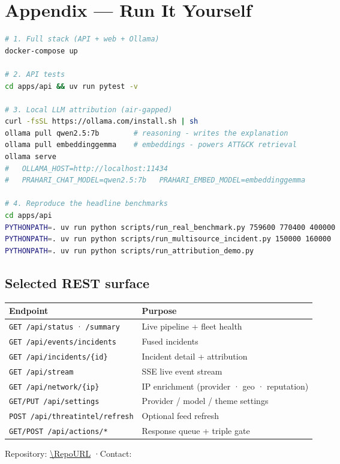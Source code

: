 \documentclass[11pt,a4paper]{article}
\begin{document}
\appendix
\section{Appendix — Run It Yourself}

\begin{lstlisting}[language=bash]
# 1. Full stack (API + web + Ollama)
docker-compose up

# 2. API tests
cd apps/api && uv run pytest -v

# 3. Local LLM attribution (air-gapped)
curl -fsSL https://ollama.com/install.sh | sh
ollama pull qwen2.5:7b        # reasoning - writes the explanation
ollama pull embeddinggemma    # embeddings - powers ATT&CK retrieval
ollama serve
#   OLLAMA_HOST=http://localhost:11434
#   PRAHARI_CHAT_MODEL=qwen2.5:7b   PRAHARI_EMBED_MODEL=embeddinggemma

# 4. Reproduce the headline benchmarks
cd apps/api
PYTHONPATH=. uv run python scripts/run_real_benchmark.py 759600 770400 400000
PYTHONPATH=. uv run python scripts/run_multisource_incident.py 150000 160000
PYTHONPATH=. uv run python scripts/run_attribution_demo.py
\end{lstlisting}

\subsection{Selected REST surface}

\begin{center}
\begin{tabularx}{\linewidth}{@{}L{5.4cm} Y@{}}
\toprule
\textbf{Endpoint} & \textbf{Purpose} \\
\midrule
\texttt{GET /api/status} · \texttt{/summary} & Live pipeline + fleet health \\
\texttt{GET /api/events/incidents} & Fused incidents \\
\texttt{GET /api/incidents/\{id\}} & Incident detail + attribution \\
\texttt{GET /api/stream} & SSE live event stream \\
\texttt{GET /api/network/\{ip\}} & IP enrichment (provider · geo · reputation) \\
\texttt{GET/PUT /api/settings} & Provider / model / theme settings \\
\texttt{POST /api/threatintel/refresh} & Optional feed refresh \\
\texttt{GET/POST /api/actions/*} & Response queue + triple gate \\
\bottomrule
\end{tabularx}
\end{center}

\vspace{0.6cm}
\begin{center}
\color{haze}\small Repository: \url{\RepoURL} \quad·\quad Contact: \href{mailto:\ContactEmail}{\ContactEmail}
\end{center}
\end{document}
